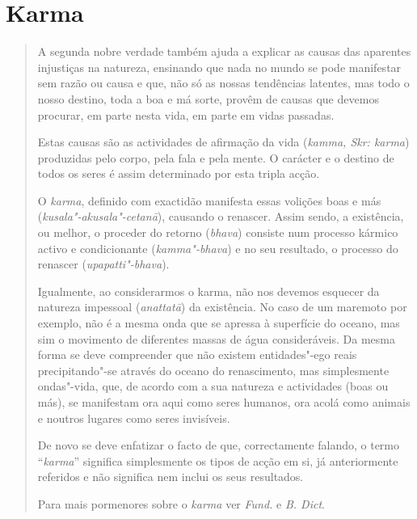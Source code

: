\section{Karma}

\begin{quote}
  A segunda nobre verdade também ajuda a explicar as causas das aparentes
  injustiças na natureza, ensinando que nada no mundo se pode manifestar sem
  razão ou causa e que, não só as nossas tendências latentes, mas todo o nosso
  destino, toda a boa e má sorte, provêm de causas que devemos procurar, em
  parte nesta vida, em parte em vidas passadas.

  Estas causas são as actividades de afirmação da vida (\emph{kamma, Skr:
    karma}) produzidas pelo corpo, pela fala e pela mente. O carácter e o
  destino de todos os seres é assim determinado por esta tripla acção.

  O \emph{karma}, definido com exactidão manifesta essas volições boas e más
  (\emph{kusala"-akusala"-cetanā}), causando o renascer. Assim sendo, a
  existência, ou melhor, o proceder do retorno (\emph{bhava}) consiste num
  processo kármico activo e condicionante (\emph{kamma"-bhava}) e no seu
  resultado, o processo do renascer (\emph{upapatti"-bhava}).

  Igualmente, ao considerarmos o karma, não nos devemos esquecer da natureza
  impessoal (\emph{anattatā}) da existência. No caso de um maremoto por exemplo,
  não é a mesma onda que se apressa à superfície do oceano, mas sim o movimento
  de diferentes massas de água consideráveis. Da mesma forma se deve compreender
  que não existem entidades"-ego reais precipitando"-se através do oceano do
  renascimento, mas simplesmente ondas"-vida, que, de acordo com a sua natureza e
  actividades (boas ou más), se manifestam ora aqui como seres humanos, ora
  acolá como animais e noutros lugares como seres invisíveis.

  De novo se deve enfatizar o facto de que, correctamente falando, o termo
  “\emph{karma}” significa simplesmente os tipos de acção em si, já
  anteriormente referidos e não significa nem inclui os seus resultados.

  Para mais pormenores sobre o \emph{karma} ver \emph{Fund.} e \emph{B. Dict}.
\end{quote}
